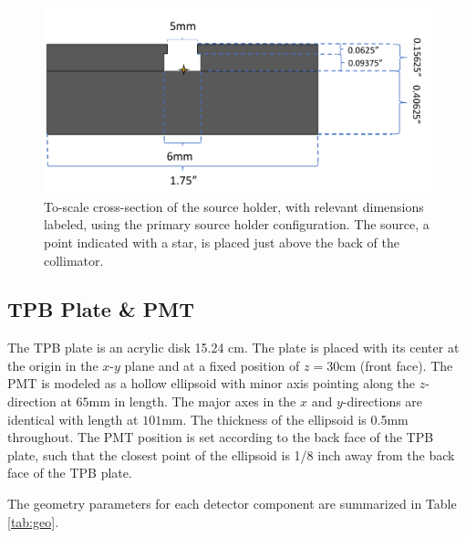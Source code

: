 \documentclass[aps,pra,notitlepage,groupedaddress]{revtex4-1}
\begin{document}
\begin{figure}
	\includegraphics[width=1.0\textwidth]{figures/holder}
	\caption{To-scale cross-section of the source holder, with relevant dimensions labeled, using the primary source holder configuration. The source, a point indicated with a star, is placed just above the back of the collimator. \label{fig:holder}}
\end{figure}

\subsection{TPB Plate \& PMT}

The TPB plate is an acrylic disk 15.24 cm. The plate is placed with its center at the origin in the $x$-$y$ plane and at a fixed position of $z=30$cm (front face). The PMT is modeled as a hollow ellipsoid with minor axis pointing along the $z$-direction at $65$mm in length. The major axes in the $x$ and $y$-directions are identical with length at $101$mm. The thickness of the ellipsoid is 0.5mm throughout. The PMT position is set according to the back face of the TPB plate, such that the closest point of the ellipsoid is 1/8 inch away from the back face of the TPB plate.

The geometry parameters for each detector component are summarized in Table \ref{tab:geo}.
\end{document}
